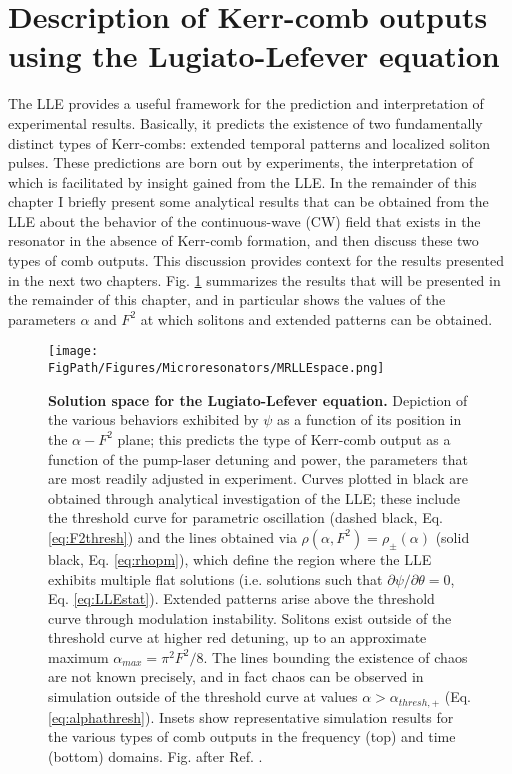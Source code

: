 \section{Description of Kerr-comb outputs using the Lugiato-Lefever equation}

The LLE provides a useful framework for the prediction and interpretation of experimental results. Basically, it predicts the existence of two fundamentally distinct types of Kerr-combs: extended temporal patterns and localized soliton pulses. These predictions are born out by experiments, the interpretation of which is facilitated by insight gained from the LLE. In the remainder of this chapter I briefly present some analytical results that can be obtained from the LLE about the behavior of the continuous-wave (CW) field that exists in the resonator in the absence of Kerr-comb formation, and then discuss these two types of comb outputs. This discussion provides context for the results presented in the next two chapters. Fig. \ref{fig:MRLLEspace} summarizes the results that will be presented in the remainder of this chapter, and in particular shows the values of the parameters $\alpha$ and $F^2$ at which solitons and extended patterns can be obtained.



\begin{figure}[htpb]
	\begin{center}
		\texttt{[image: \\FigPath/Figures/Microresonators/MRLLEspace.png]}
	\end{center}
	\caption[Solution space for the Lugiato-Lefever equation]{\textbf{Solution space for the Lugiato-Lefever equation.} Depiction of the various behaviors exhibited by $\psi$ as a function of its position in the $\alpha-F^2$ plane; this predicts the type of Kerr-comb output as a function of the pump-laser detuning and power, the parameters that are most readily adjusted in experiment. Curves plotted in black are obtained through analytical investigation of the LLE; these include the threshold curve for parametric oscillation (dashed black, Eq. \ref{eq:F2thresh}) and the lines obtained via $\rho(\alpha,F^2)=\rho_\pm(\alpha)$ (solid black, Eq. \ref{eq:rhopm}), which define the region where the LLE exhibits multiple flat solutions (i.e. solutions such that $\partial \psi/\partial \theta=0$, Eq. \ref{eq:LLEstat}). Extended patterns arise above the threshold curve through modulation instability. Solitons exist outside of the threshold curve at higher red detuning, up to an approximate maximum $\alpha_{max}=\pi^2 F^2/8$. The lines bounding the existence of chaos are not known precisely, and in fact chaos can be observed in simulation outside of the threshold curve at values $\alpha>\alpha_{thresh,+}$ (Eq. \ref{eq:alphathresh}). Insets show representative simulation results for the various types of comb outputs in the frequency (top) and time (bottom) domains. \footnotesize{Fig. after Ref. \cite{Godey2014}}.
	 }
	
	\label{fig:MRLLEspace}
\end{figure} 



